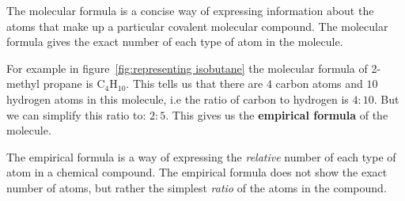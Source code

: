  {The molecular formula is a concise way of expressing information about the atoms that make up a particular covalent molecular compound. The molecular formula gives the exact number of each type of atom in the molecule. } 

For example in figure~\ref{fig:representing isobutane} the molecular formula of 2-methyl propane is $\text{C}_{4}\text{H}_{10}$. This tells us that there are $4$ carbon atoms and $10$ hydrogen atoms in this molecule, i.e the ratio of carbon to hydrogen is $4:10$. But we can simplify this ratio to: $2:5$. This gives us the \textbf{empirical formula} of the molecule. 

 { \label{m38120*meaningfhsst!!!underscore!!!id93}
The empirical formula is a way of expressing the \textsl{relative} number of each type of atom in a chemical compound. The empirical formula does not show the exact number of atoms, but rather the simplest \textsl{ratio} of the atoms in the compound. }


